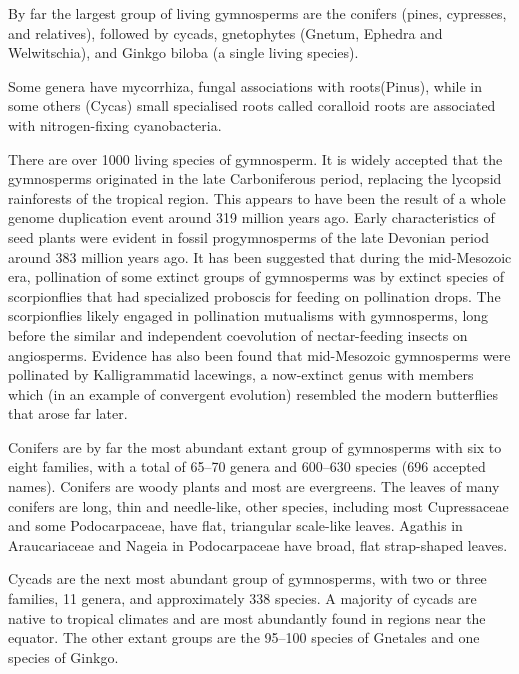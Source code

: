 By far the largest group of living gymnosperms are the conifers (pines, cypresses, and relatives), followed by cycads, gnetophytes (Gnetum, Ephedra and Welwitschia), and Ginkgo biloba (a single living species).

Some genera have mycorrhiza, fungal associations with roots(Pinus), while in some others (Cycas) small specialised roots called coralloid roots are associated with nitrogen-fixing cyanobacteria.

There are over 1000 living species of gymnosperm. It is widely accepted that the gymnosperms originated in the late Carboniferous period, replacing the lycopsid rainforests of the tropical region. This appears to have been the result of a whole genome duplication event around 319 million years ago. Early characteristics of seed plants were evident in fossil progymnosperms of the late Devonian period around 383 million years ago. It has been suggested that during the mid-Mesozoic era, pollination of some extinct groups of gymnosperms was by extinct species of scorpionflies that had specialized proboscis for feeding on pollination drops. The scorpionflies likely engaged in pollination mutualisms with gymnosperms, long before the similar and independent coevolution of nectar-feeding insects on angiosperms. Evidence has also been found that mid-Mesozoic gymnosperms were pollinated by Kalligrammatid lacewings, a now-extinct genus with members which (in an example of convergent evolution) resembled the modern butterflies that arose far later.

Conifers are by far the most abundant extant group of gymnosperms with six to eight families, with a total of 65--70 genera and 600--630 species (696 accepted names). Conifers are woody plants and most are evergreens. The leaves of many conifers are long, thin and needle-like, other species, including most Cupressaceae and some Podocarpaceae, have flat, triangular scale-like leaves. Agathis in Araucariaceae and Nageia in Podocarpaceae have broad, flat strap-shaped leaves.

Cycads are the next most abundant group of gymnosperms, with two or three families, 11 genera, and approximately 338 species. A majority of cycads are native to tropical climates and are most abundantly found in regions near the equator. The other extant groups are the 95--100 species of Gnetales and one species of Ginkgo.

